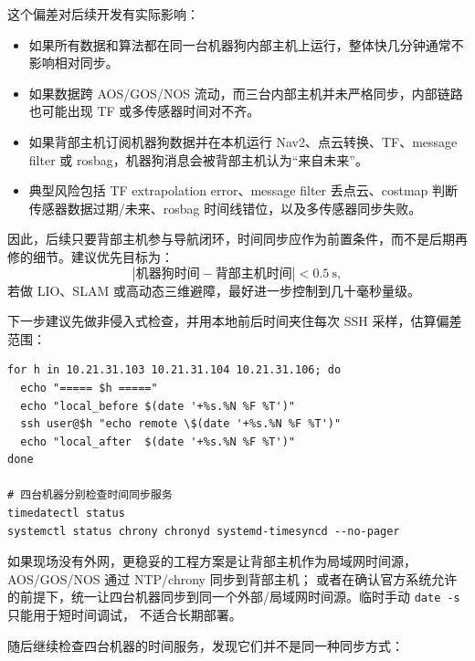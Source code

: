 \documentclass[UTF8,11pt,a4paper]{ctexart}
\begin{document}
这个偏差对后续开发有实际影响：

\begin{itemize}
  \item 如果所有数据和算法都在同一台机器狗内部主机上运行，整体快几分钟通常不影响相对同步。
  \item 如果数据跨 AOS/GOS/NOS 流动，而三台内部主机并未严格同步，内部链路也可能出现 TF 或多传感器时间对不齐。
  \item 如果背部主机订阅机器狗数据并在本机运行 Nav2、点云转换、TF、message filter 或 rosbag，机器狗消息会被背部主机认为“来自未来”。
  \item 典型风险包括 TF extrapolation error、message filter 丢点云、costmap 判断传感器数据过期/未来、rosbag 时间线错位，以及多传感器同步失败。
\end{itemize}

因此，后续只要背部主机参与导航闭环，时间同步应作为前置条件，而不是后期再修的细节。建议优先目标为：
\[
|\text{机器狗时间}-\text{背部主机时间}| < 0.5\ \mathrm{s},
\]
若做 LIO、SLAM 或高动态三维避障，最好进一步控制到几十毫秒量级。

下一步建议先做非侵入式检查，并用本地前后时间夹住每次 SSH 采样，估算偏差范围：

\begin{verbatim}
for h in 10.21.31.103 10.21.31.104 10.21.31.106; do
  echo "===== $h ====="
  echo "local_before $(date '+%s.%N %F %T')"
  ssh user@$h "echo remote \$(date '+%s.%N %F %T')"
  echo "local_after  $(date '+%s.%N %F %T')"
done

# 四台机器分别检查时间同步服务
timedatectl status
systemctl status chrony chronyd systemd-timesyncd --no-pager
\end{verbatim}

如果现场没有外网，更稳妥的工程方案是让背部主机作为局域网时间源，AOS/GOS/NOS 通过 NTP/chrony 同步到背部主机；
或者在确认官方系统允许的前提下，统一让四台机器同步到同一个外部/局域网时间源。临时手动 \texttt{date -s} 只能用于短时间调试，
不适合长期部署。

随后继续检查四台机器的时间服务，发现它们并不是同一种同步方式：
\end{document}
